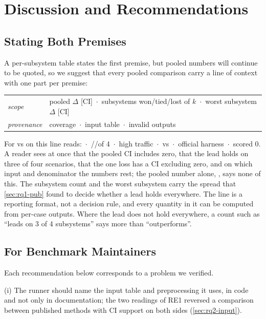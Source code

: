 \section{Discussion and Recommendations}
\label{sec:discussion}

\subsection{Stating Both Premises}
\label{sec:disc-authors}

A per-subsystem table states the first premise, but pooled numbers will continue to be quoted, so we suggest that every pooled comparison carry a line of context with one part per premise:
\par\medskip\noindent\hspace*{2em}%
{\small\begin{tabular}[t]{@{}l@{\quad}l@{}}
\textit{scope} & pooled $\Delta$ [CI] \,$\cdot$\, subsystems won/tied/lost of $k$ \,$\cdot$\, worst subsystem $\Delta$ [CI] \\
\textit{provenance} & coverage \,$\cdot$\, input table \,$\cdot$\, invalid outputs
\end{tabular}}
\par\medskip\noindent
For \rcd vs \baro on \petshop this line reads: \LinePooled \LinePooledCI \,$\cdot$\, \LineWins/\LineTies/\LineLosses of 4 \,$\cdot$\, high traffic \LineWorst \LineWorstCI \,$\cdot$\, \LineCovRcd vs \LineCovBaro \,$\cdot$\, official harness \,$\cdot$\, scored 0.
A reader sees at once that the pooled CI includes zero, that the lead holds on three of four scenarios, that the one loss has a CI excluding zero, and on which input and denominator the numbers rest; the pooled number alone, \LinePooled, says none of this.
The subsystem count and the worst subsystem carry the spread that \cref{sec:rq1-pub} found to decide whether a lead holds everywhere.
The line is a reporting format, not a decision rule, and every quantity in it can be computed from per-case outputs.
Where the lead does not hold everywhere, a count such as ``leads on 3 of 4 subsystems'' says more than ``outperforms''.

\subsection{For Benchmark Maintainers}
\label{sec:disc-maintainers}

Each recommendation below corresponds to a problem we verified.

(i) The runner should name the input table and preprocessing it uses, in code and not only in documentation; the two readings of RE1 reversed a comparison between published methods with CI support on both sides (\cref{sec:rq2-input}).

